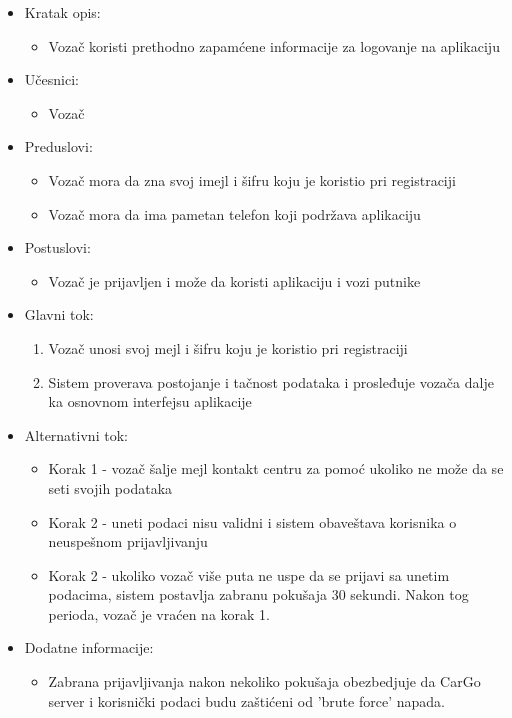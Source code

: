 \begin{itemize}
    \item Kratak opis:
        \begin{itemize}
            \item Vozač koristi prethodno zapamćene informacije za logovanje na aplikaciju
        \end{itemize}
        
    \item Učesnici:
        \begin{itemize}
            \item Vozač
        \end{itemize}
        
    \item Preduslovi:
        \begin{itemize}
            \item Vozač mora da zna svoj imejl i šifru koju je koristio pri registraciji
            \item Vozač mora da ima pametan telefon koji podržava aplikaciju
        \end{itemize}
        
    \item Postuslovi:
        \begin{itemize}
            \item Vozač je prijavljen i može da koristi aplikaciju i vozi putnike
        \end{itemize}
        
    \item Glavni tok:
        \begin{enumerate}
            \item Vozač unosi svoj mejl i šifru koju je koristio pri registraciji
            \item Sistem proverava postojanje i tačnost podataka i prosleđuje vozača dalje ka osnovnom interfejsu aplikacije
        \end{enumerate}
        
    \item Alternativni tok:
        \begin{itemize}
            \item Korak 1 - vozač šalje mejl kontakt centru za pomoć ukoliko ne može da se seti svojih podataka
            \item Korak 2 - uneti podaci nisu validni i sistem obaveštava korisnika o neuspešnom prijavljivanju
            \item Korak 2 - ukoliko vozač više puta ne uspe da se prijavi sa unetim podacima, sistem postavlja zabranu pokušaja 30 sekundi. Nakon tog perioda, vozač je vraćen na korak 1.
        \end{itemize}
    \item Dodatne informacije:
        \begin{itemize}
            \item Zabrana prijavljivanja nakon nekoliko pokušaja obezbedjuje da CarGo server i korisnički podaci budu zaštićeni od 'brute force' napada.
        \end{itemize}
\end{itemize}



